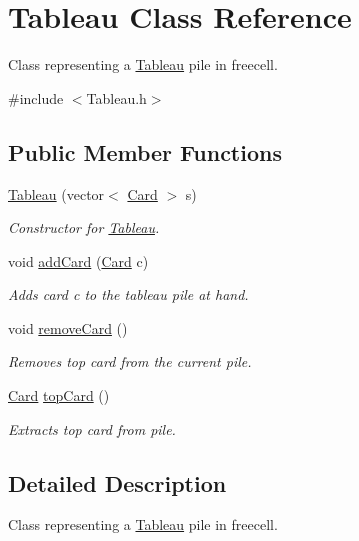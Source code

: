 \hypertarget{class_tableau}{}\section{Tableau Class Reference}
\label{class_tableau}


Class representing a \hyperlink{class_tableau}{Tableau} pile in freecell.  




{\ttfamily \#include $<$Tableau.\+h$>$}

\subsection*{Public Member Functions}
\begin{DoxyCompactItemize}
\item 
\hyperlink{class_tableau_a3cc548851797e21bea1bcaace6d0dc31}{Tableau} (vector$<$ \hyperlink{class_card}{Card} $>$ s)
\begin{DoxyCompactList}\small\item\em Constructor for \hyperlink{class_tableau}{Tableau}. \end{DoxyCompactList}\item 
void \hyperlink{class_tableau_a6d5eb19094e55901856cccb871066e52}{add\+Card} (\hyperlink{class_card}{Card} c)
\begin{DoxyCompactList}\small\item\em Adds card c to the tableau pile at hand. \end{DoxyCompactList}\item 
void \hyperlink{class_tableau_a6f27dda547e77b4a3ed7de954faf1d97}{remove\+Card} ()\hypertarget{class_tableau_a6f27dda547e77b4a3ed7de954faf1d97}{}\label{class_tableau_a6f27dda547e77b4a3ed7de954faf1d97}

\begin{DoxyCompactList}\small\item\em Removes top card from the current pile. \end{DoxyCompactList}\item 
\hyperlink{class_card}{Card} \hyperlink{class_tableau_a181138b61d0cadf5044f44712a45ccf9}{top\+Card} ()
\begin{DoxyCompactList}\small\item\em Extracts top card from pile. \end{DoxyCompactList}\end{DoxyCompactItemize}


\subsection{Detailed Description}
Class representing a \hyperlink{class_tableau}{Tableau} pile in freecell. 

